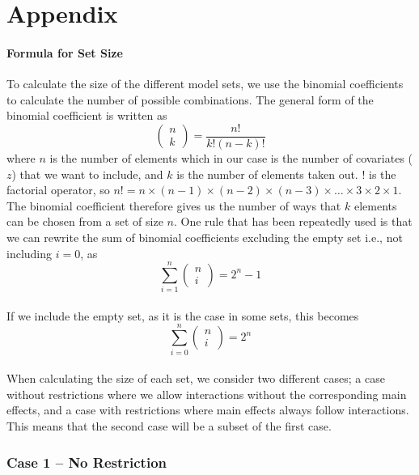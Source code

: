 \part*{Appendix} 

\setcounter{table}{0}
\setcounter{figure}{0}
\renewcommand{\thetable}{S\arabic{table}}
\renewcommand{\thefigure}{S\arabic{figure}}

\subsection{Formula for Set Size}
To calculate the size of the different model sets, we use the binomial coefficients to calculate the number of possible combinations. The general form of the binomial coefficient is written as
\[\left( \begin{array}{c}
n \\ 
k \end{array}
\right)=\frac{n!}{k!\left(n-k\right)!}\] 
where $n$ is the number of elements which in our case is the number of covariates ($z$) that we want to include, and $k$ is the number of elements taken out. $!$ is the factorial operator, so $n!=n\times \left(n-1\right)\times \left(n-2\right)\times \left(n-3\right)\times \dots \times 3\times 2\times 1$. The binomial coefficient therefore gives us the number of ways that $k$ elements can be chosen from a set of size $n$. One rule that has been repeatedly used is that we can rewrite the sum of binomial coefficients excluding the empty set i.e., not including $i=0$, as 
\[\sum^n_{i=1}{\left( \begin{array}{c}
n \\ 
i \end{array}
\right)}=2^n-1\] 
\\
If we include the empty set, as it is the case in some sets, this becomes
\[\sum^n_{i=0}{\left( \begin{array}{c}
n \\ 
i \end{array}
\right)}=2^n\] 
\\
When calculating the size of each set, we consider two different cases; a case without restrictions where we allow interactions without the corresponding main effects, and a case with restrictions where main effects always follow interactions. This means that the second case will be a subset of the first case. \\

\section{Case 1 – No Restriction}
